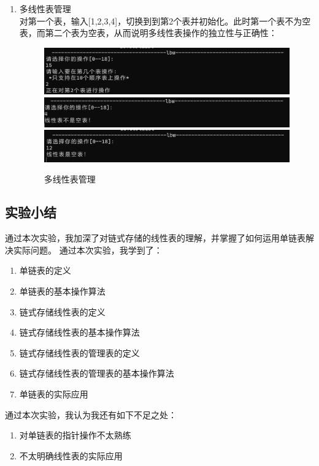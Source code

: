 \documentclass[supercite]{Experimental_Report}
\theoremstyle{definition}
\begin{document}
\begin{enumerate}
	\item 多线性表管理\\
		对第一个表，输入[1,2,3,4]，切换到到第2个表并初始化。此时第一个表不为空表，而第二个表为空表，从而说明多线性表操作的独立性与正确性：
		\begin{figure}[H]
			\centering
			\includegraphics[width=1\linewidth]{images/多表切换.png}
			\includegraphics[width=1\linewidth]{images/多表操作成功.png}
			\includegraphics[width=1\linewidth]{images/多表操作结果.png}
			\caption{多线性表管理}
			\label{fig1-37}
		\end{figure}
	\end{enumerate}
\subsection{实验小结}
通过本次实验，我加深了对链式存储的线性表的理解，并掌握了如何运用单链表解决实际问题。
通过本次实验，我学到了：
\begin{enumerate}
	\item 单链表的定义
    \item 单链表的基本操作算法
	\item 链式存储线性表的定义
    \item 链式存储线性表的基本操作算法
    \item 链式存储线性表的管理表的定义
    \item 链式存储线性表的管理表的基本操作算法
    \item 单链表的实际应用
\end{enumerate}
通过本次实验，我认为我还有如下不足之处：
\begin{enumerate}
	\item 对单链表的指针操作不太熟练
    \item 不太明确线性表的实际应用
\end{enumerate}
\newpage
\end{document}
